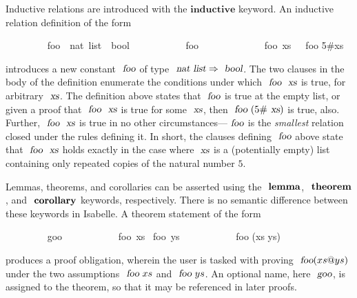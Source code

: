 Inductive relations are introduced with the $\mathbf{inductive}$ keyword.
An inductive relation definition of the form
\vspace{0.375em}
\begin{isabellebody}
\ \ \ \ \ \ \ \  foo\ {\isacharcolon}{\isacharcolon}\ {\isachardoublequoteopen}nat\ list\ {\isasymRightarrow}\ bool{\isachardoublequoteclose}\ \isanewline
\ \ \ \ \ \ \ \ \ \ {\isachardoublequoteopen}foo\ {\isacharbrackleft}{\isacharbrackright}{\isachardoublequoteclose}\ {\isacharbar}\isanewline
\ \ \ \ \ \ \ \ \ \ {\isachardoublequoteopen}{\isasymlbrakk}\ foo\ xs\ {\isasymrbrakk}\ {\isasymLongrightarrow}\ foo {\isacharparenleft}5\#xs{\isacharparenright}{\isachardoublequoteclose}
\end{isabellebody}
\vspace{0.375em}
\noindent
introduces a new constant $\isa{foo}$ of type $\isa{nat list} \Rightarrow \isa{bool}$.
The two clauses in the body of the definition enumerate the conditions under which $\isa{foo}\ \isa{xs}$ is true, for arbitrary $\isa{xs}$.
The definition above states that $\isa{foo}$ is true at the empty list, or given a proof that $\isa{foo}\ \isa{xs}$ is true for some $\isa{xs}$, then $\isa{foo}\ (5\#\isa{xs})$ is true, also.
Further, $\isa{foo}\ \isa{xs}$ is true in no other circumstances---$\isa{foo}$ is the \emph{smallest} relation closed under the rules defining it.
In short, the clauses defining $\isa{foo}$ above state that $\isa{foo}\ \isa{xs}$ holds exactly in the case where $\isa{xs}$ is a (potentially empty) list containing only repeated copies of the natural number $5$.

Lemmas, theorems, and corollaries can be asserted using the $\isacommand{lemma}$, $\isacommand{theorem}$, and $\isacommand{corollary}$ keywords, respectively.
There is no semantic difference between these keywords in Isabelle.
A theorem statement of the form
\vspace{0.375em}
\begin{isabellebody}
\ \ \ \ \ \ \ \  goo{\isacharcolon}\isanewline
\ \ \ \ \ \ \ \ \ \ \ foo\ xs \ foo\ ys \isanewline
\ \ \ \ \ \ \ \ \ \ \ foo (xs \isacharat ys)
\end{isabellebody}
\vspace{0.375em}
\noindent
produces a proof obligation, wherein the user is tasked with proving $\isa{foo} (xs \isacharat ys)$ under the two assumptions $\isa{foo}\ xs$ and $\isa{foo}\ ys$.
An optional name, here $\isa{goo}$, is assigned to the theorem, so that it may be referenced in later proofs.

